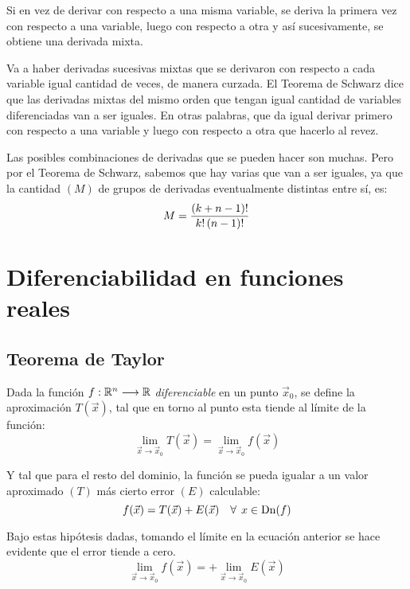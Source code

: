 \documentclass[a5paper,12pt,twoside]{book}
\begin{document}
Si en vez de derivar con respecto a una misma variable, se deriva la primera vez con respecto a una variable, luego con respecto a otra y así sucesivamente, se obtiene una derivada mixta.

Va a haber derivadas sucesivas mixtas que se derivaron con respecto a cada variable igual cantidad de veces, de manera curzada. El Teorema de Schwarz dice que las derivadas mixtas del mismo orden que tengan igual cantidad de variables diferenciadas van a ser iguales. En otras palabras, que da igual derivar primero con respecto a una variable y luego con respecto a otra que hacerlo al revez.

Las posibles combinaciones de derivadas que se pueden hacer son muchas. Pero por el Teorema de Schwarz, sabemos que hay varias que van a ser iguales, ya que la cantidad $(M)$ de grupos de derivadas eventualmente distintas entre sí, es:
\begin{equation*}
    M = \dfrac{(k+n-1)!}{k!\left(n-1\right)!}
\end{equation*}


\chapter{Diferenciabilidad en funciones reales}


\section{Teorema de Taylor}

Dada la función $f:\mathbb{R}^n \longrightarrow \mathbb{R}$ \emph{diferenciable} en un punto $\Vec{x}_0$, se define la aproximación $T(\Vec{x})$, tal que en torno al punto esta tiende al límite de la función:
\begin{equation*}
    \lim_{\Vec{x} \to \Vec{x}_0} T(\Vec{x}) = \lim_{\Vec{x} \to \Vec{x}_0} f(\Vec{x})
\end{equation*}

Y tal que para el resto del dominio, la función se pueda igualar a un valor aproximado $(T)$ más cierto error $(E)$ calculable:
\begin{equation*}
    f(\Vec{x}) = T(\Vec{x}) + E(\Vec{x}) \quad \forall \hspace{1ex} x \in \operatorname{Dn}(f)
\end{equation*}

Bajo estas hipótesis dadas, tomando el límite en la ecuación anterior se hace evidente que el error tiende a cero.
\begin{equation*}
    \lim_{\Vec{x} \to \Vec{x}_0} f(\Vec{x})
    = 
    + \lim_{\Vec{x} \to \Vec{x}_0} E(\Vec{x})
\end{equation*}
\end{document}
